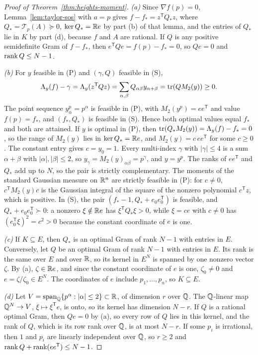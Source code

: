 \begin{proof}[Proof of Theorem~\ref{thm:heights-moment}]
\emph{(a)} Since $\nabla f(p)=0$, Lemma~\ref{lem:taylor-sos} with $a=p$ gives
$f-f_*=z^{\mathsf T}Q_*z$, where $Q_*=\mathcal T_p(A)\succeq0$,
$\ker Q_*=\mathbb R e$ by part (b) of that lemma, and the entries of $Q_*$ lie in
$K$ by part (d), because $f$ and $A$ are rational. If $Q$ is any positive
semidefinite Gram of $f-f_*$, then $e^{\mathsf T}Qe=f(p)-f_*=0$, so $Qe=0$ and
$\operatorname{rank} Q\le N-1$.

\emph{(b)} For $y$ feasible in (P) and $(\gamma,Q)$ feasible in (S),
\[
 \Lambda_y(f)-\gamma=\Lambda_y(z^{\mathsf T}Qz)
 =\sum_{\alpha,\beta}Q_{\alpha\beta}y_{\alpha+\beta}=\operatorname{tr}(QM_2(y))\ge0 .
\]
The point sequence $y^p_\alpha=p^\alpha$ is feasible in (P), with
$M_2(y^p)=ee^{\mathsf T}$ and value $f(p)=f_*$, and $(f_*,Q_*)$ is feasible in
(S). Hence both optimal values equal $f_*$ and both are attained. If $y$ is
optimal in (P), then $\operatorname{tr}(Q_*M_2(y))=\Lambda_y(f)-f_*=0$, so the range of
$M_2(y)$ lies in $\ker Q_*=\mathbb R e$, and $M_2(y)=c\,ee^{\mathsf T}$ for some
$c\ge0$. The constant entry gives $c=y_0=1$. Every multi-index $\gamma$ with
$|\gamma|\le4$ is a sum $\alpha+\beta$ with $|\alpha|,|\beta|\le2$, so
$y_\gamma=M_2(y)_{\alpha\beta}=p^\gamma$, and $y=y^p$. The ranks of
$ee^{\mathsf T}$ and $Q_*$ add up to $N$, so the pair is strictly
complementary. The moments of the standard Gaussian measure on $\mathbb R^n$ are
strictly feasible in (P): for $c\ne0$,
$c^{\mathsf T}M_2(y)c$ is the Gaussian integral of the square of the nonzero
polynomial $c^{\mathsf T}z$, which is positive. In (S), the pair
$(f_*-1,Q_*+e_0e_0^{\mathsf T})$ is feasible, and $Q_*+e_0e_0^{\mathsf T}\succ0$:
a nonzero $\xi\notin\mathbb R e$ has $\xi^{\mathsf T}Q_*\xi>0$, while $\xi=ce$ with
$c\ne0$ has $(e_0^{\mathsf T}\xi)^2=c^2>0$ because the constant coordinate of
$e$ is one.

\emph{(c)} If $K\subseteq E$, then $Q_*$ is an optimal Gram of rank $N-1$ with
entries in $E$. Conversely, let $Q$ be an optimal Gram of rank $N-1$ with
entries in $E$. Its rank is the same over $E$ and over $\mathbb R$, so its kernel in
$E^N$ is spanned by one nonzero vector $\zeta$. By (a), $\zeta\in\mathbb R e$, and
since the constant coordinate of $e$ is one, $\zeta_0\ne0$ and
$e=\zeta/\zeta_0\in E^N$. The coordinates of $e$ include $p_1,\ldots,p_n$,
so $K\subseteq E$.

\emph{(d)} Let $V=\operatorname{span}_\mathbb Q\{p^\alpha:|\alpha|\le2\}\subset\mathbb R$, of dimension
$r$ over $\mathbb Q$. The $\mathbb Q$-linear map $\mathbb Q^N\to V$, $\xi\mapsto\xi^{\mathsf T}e$, is
onto, so its kernel has dimension $N-r$. If $Q$ is a rational optimal Gram,
then $Qe=0$ by (a), so every row of $Q$ lies in this kernel, and the rank of
$Q$, which is its row rank over $\mathbb Q$, is at most $N-r$. If some $p_i$ is
irrational, then $1$ and $p_i$ are linearly independent over $\mathbb Q$, so $r\ge2$
and $\operatorname{rank} Q+\operatorname{rank}(ee^{\mathsf T})\le N-1$.


\end{proof}
